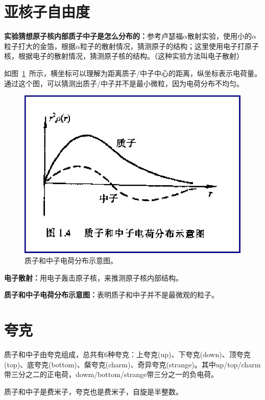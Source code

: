 \section{亚核子自由度}

\textbf{实验猜想原子核内部质子中子是怎么分布的：}参考卢瑟福$\alpha$散射实验，使用小的$\alpha$粒子打大的金箔，根据$\alpha$粒子的散射情况，猜测原子的结构；这里使用电子打原子核，根据电子的散射情况，猜测原子核的结构。（这种实验方法叫电子散射）

如图~\ref{fig002}~所示，横坐标可以理解为距离质子/中子中心的距离，纵坐标表示电荷量。通过这个图，可以猜测出质子/中子并不是最小微粒，因为电荷分布不均匀。

\begin{figure}[htbp]
    \centering
    \includegraphics[width=14cm]{figure//fig002.png}
    \caption{\label{fig002}质子和中子电荷分布示意图。}
\end{figure}

\textbf{电子散射：}用电子轰击原子核，来推测原子核内部结构。

\textbf{质子和中子电荷分布示意图：}表明质子和中子并不是最微观的粒子。

\section{夸克}

质子和中子由夸克组成，总共有6种夸克：上夸克(up)、下夸克(down)、顶夸克(top)、底夸克(bottom)、粲夸克(charm)、奇异夸克(strange)。其中up/top/charm带三分之二的正电荷，dowm/bottom/strange带三分之一的负电荷。

质子和中子是费米子，夸克也是费米子，自旋是半整数。

